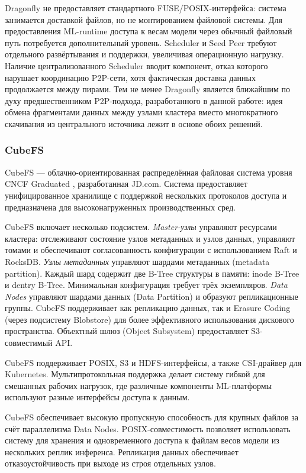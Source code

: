  Dragonfly не предоставляет стандартного FUSE/POSIX-интерфейса: система занимается доставкой файлов, но не монтированием файловой системы. Для предоставления ML-runtime доступа к весам модели через обычный файловый путь потребуется дополнительный уровень. Scheduler и Seed Peer требуют отдельного развёртывания и поддержки, увеличивая операционную нагрузку. Наличие централизованного Scheduler вводит компонент, отказ которого нарушает координацию P2P-сети, хотя фактическая доставка данных продолжается между пирами. Тем не менее Dragonfly является ближайшим по духу предшественником P2P-подхода, разработанного в данной работе: идея обмена фрагментами данных между узлами кластера вместо многократного скачивания из центрального источника лежит в основе обоих решений.

\subsubsection{CubeFS}

CubeFS --- облачно-ориентированная распределённая файловая система уровня CNCF Graduated \cite{cubefs_arch}, разработанная JD.com. Система предоставляет унифицированное хранилище с поддержкой нескольких протоколов доступа и предназначена для высоконагруженных производственных сред.

 CubeFS включает несколько подсистем. \textit{Master-узлы} управляют ресурсами кластера: отслеживают состояние узлов метаданных и узлов данных, управляют томами и обеспечивают согласованность конфигурации с использованием Raft и RocksDB. \textit{Узлы метаданных} управляют шардами метаданных (metadata partition). Каждый шард содержит две B-Tree структуры в памяти: inode B-Tree и dentry B-Tree. Минимальная конфигурация требует трёх экземпляров. \textit{Data Nodes} управляют шардами данных (Data Partition) и образуют репликационные группы. CubeFS поддерживает как репликацию данных, так и Erasure Coding (через подсистему Blobstore) для более эффективного использования дискового пространства. Объектный шлюз (Object Subsystem) предоставляет S3-совместимый API.

 CubeFS поддерживает POSIX, S3 и HDFS-интерфейсы, а также CSI-драйвер для Kubernetes. Мультипротокольная поддержка делает систему гибкой для смешанных рабочих нагрузок, где различные компоненты ML-платформы используют разные интерфейсы доступа к данным.

 CubeFS обеспечивает высокую пропускную способность для крупных файлов за счёт параллелизма Data Nodes. POSIX-совместимость позволяет использовать систему для хранения и одновременного доступа к файлам весов модели из нескольких реплик инференса. Репликация данных обеспечивает отказоустойчивость при выходе из строя отдельных узлов.

